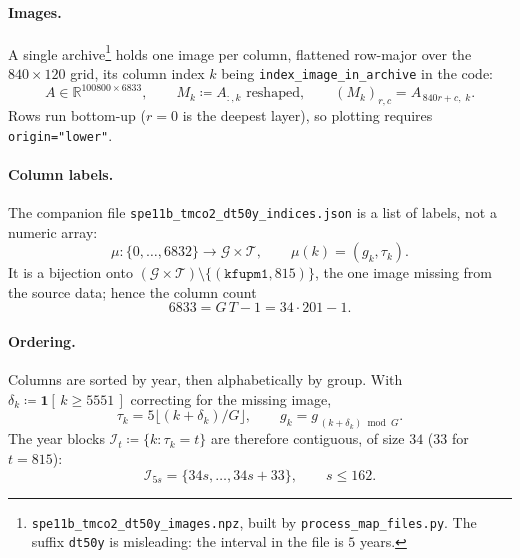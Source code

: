 \documentclass[11pt]{article}
\newcommand{\R}{\mathbb{R}}
\newcommand{\Gr}{\mathcal{G}}
\newcommand{\Ti}{\mathcal{T}}
\begin{document}
\paragraph{Images.} A single archive\footnote{%
\texttt{spe11b\_tmco2\_dt50y\_images.npz}, built by
\texttt{process\_map\_files.py}. The suffix \texttt{dt50y} is misleading: the
interval in the file is $5$ years.} holds one image per column, flattened
row-major over the $840 \times 120$ grid, its column index $k$ being
\texttt{index\_image\_in\_archive} in the code:
%
\begin{equation}
  A \in \R^{100800 \times 6833},
  \qquad
  M_k \coloneqq A_{:,k} \text{ reshaped},
  \qquad
  (M_k)_{r,c} = A_{\,840 r + c,\; k}.
  \label{eq:images}
\end{equation}
%
Rows run bottom-up ($r = 0$ is the deepest layer), so plotting requires
\texttt{origin="lower"}.

\paragraph{Column labels.} The companion file
\texttt{spe11b\_tmco2\_dt50y\_indices.json} is a list of labels, not a numeric
array:
%
\begin{equation}
  \mu : \{0, \dots, 6832\} \to \Gr \times \Ti,
  \qquad
  \mu(k) = (g_k, \tau_k).
  \label{eq:labels}
\end{equation}
%
It is a bijection onto $(\Gr \times \Ti) \setminus \{(\texttt{kfupm1}, 815)\}$,
the one image missing from the source data; hence the column count
%
\begin{equation}
  6833 = G\,T - 1 = 34 \cdot 201 - 1 .
\end{equation}

\paragraph{Ordering.} Columns are sorted by year, then alphabetically by group.
With $\delta_k \coloneqq \mathbf{1}[\,k \ge 5551\,]$ correcting for the missing
image,
%
\begin{equation}
  \tau_k = 5 \bigl\lfloor (k + \delta_k) / G \bigr\rfloor,
  \qquad
  g_k = g_{\,(k + \delta_k) \bmod G} .
  \label{eq:ordering}
\end{equation}
%
The year blocks $\mathcal{I}_t \coloneqq \{k : \tau_k = t\}$ are therefore
contiguous, of size $34$ ($33$ for $t = 815$):
%
\begin{equation}
  \mathcal{I}_{5s} = \{34 s, \dots, 34 s + 33\},
  \qquad s \le 162 .
  \label{eq:blocks}
\end{equation}
\end{document}

